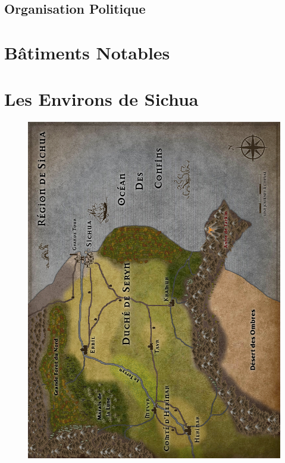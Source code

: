 \documentclass{dd}
\begin{document}
\section{Organisation Politique}




\chapter{Bâtiments Notables}

















\chapter{Les Environs de Sichua}

\begin{figure}[p]
\includegraphics[width=17.5cm]{Maps/RegionL.jpg}
\end{figure}
\end{document}
